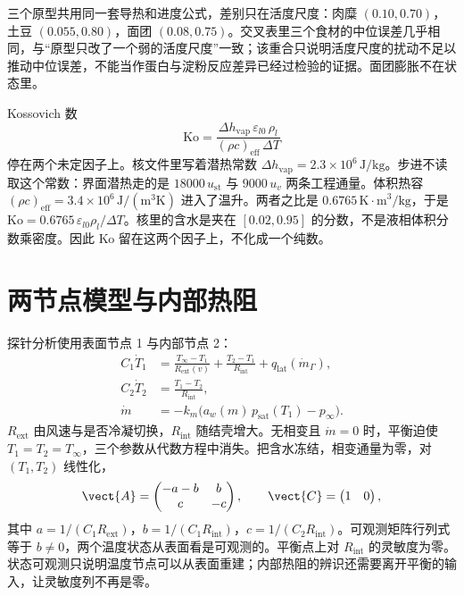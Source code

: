 三个原型共用同一套导热和进度公式，差别只在活度尺度：肉糜 \((0.10,0.70)\)，土豆 \((0.055,0.80)\)，面团 \((0.08,0.75)\)。交叉表里三个食材的中位误差几乎相同，与“原型只改了一个弱的活度尺度”一致；该重合只说明活度尺度的扰动不足以推动中位误差，不能当作蛋白与淀粉反应差异已经过检验的证据。面团膨胀不在状态里。

Kossovich 数
\[
\mathrm{Ko}
=\frac{\Delta h_{\mathrm{vap}}\,\varepsilon_{l0}\,\rho_l}{(\rho c)_{\mathrm{eff}}\,\Delta T}
\]
停在两个未定因子上。核文件里写着潜热常数 \(\Delta h_{\mathrm{vap}}=2.3\times 10^{6}\,\mathrm{J/kg}\)。步进不读取这个常数：界面潜热走的是 \(18000\,u_{\mathrm{st}}\) 与 \(9000\,u_v\) 两条工程通量。体积热容 \((\rho c)_{\mathrm{eff}}=3.4\times 10^{6}\,\mathrm{J}/(\mathrm{m}^3\mathrm{K})\) 进入了温升。两者之比是 \(0.6765\,\mathrm{K\cdot m}^3/\mathrm{kg}\)，于是 \(\mathrm{Ko}=0.6765\,\varepsilon_{l0}\rho_l/\Delta T\)。核里的含水是夹在 \([0.02,0.95]\) 的分数，不是液相体积分数乘密度。因此 Ko 留在这两个因子上，不化成一个纯数。

\section{两节点模型与内部热阻}

探针分析使用表面节点 1 与内部节点 2：
\begin{align}
\label{eq:twonode}
C_1\dot T_1
&=\frac{T_\infty-T_1}{R_{\mathrm{ext}}(v)}+\frac{T_2-T_1}{R_{\mathrm{int}}}
+q_{\mathrm{lat}}(\dot m_\Gamma),\\
C_2\dot T_2
&=\frac{T_1-T_2}{R_{\mathrm{int}}},\\
\dot m
&=-k_m\big(a_w(m)\,p_{\mathrm{sat}}(T_1)-p_\infty\big).
\end{align}
\(R_{\mathrm{ext}}\) 由风速与是否冷凝切换，\(R_{\mathrm{int}}\) 随结壳增大。无相变且 \(\dot m=0\) 时，平衡迫使 \(T_1=T_2=T_\infty\)，三个参数从代数方程中消失。把含水冻结，相变通量为零，对 \((T_1,T_2)\) 线性化，
\[
\vect{A}=\begin{pmatrix}-a-b & b\\ c & -c\end{pmatrix},\qquad
\vect{C}=\begin{pmatrix}1 & 0\end{pmatrix},
\]
其中 \(a=1/(C_1 R_{\mathrm{ext}})\)，\(b=1/(C_1 R_{\mathrm{int}})\)，\(c=1/(C_2 R_{\mathrm{int}})\)。可观测矩阵行列式等于 \(b\neq 0\)，两个温度状态从表面看是可观测的。平衡点上对 \(R_{\mathrm{int}}\) 的灵敏度为零。状态可观测只说明温度节点可以从表面重建；内部热阻的辨识还需要离开平衡的输入，让灵敏度列不再是零。

